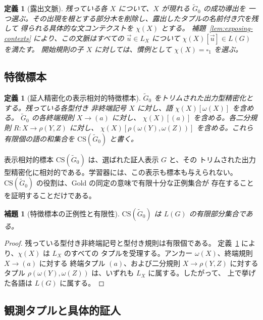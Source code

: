 \documentclass[11pt,a4paper]{ltjsarticle}
\newtheorem{lemma}[theorem]{補題}
\newtheorem{definition}[theorem]{定義}
\theoremstyle{remark}
\newcommand{\CS}{\mathrm{CS}}
\newcommand{\tuple}[1]{\vec{#1}}
\newcommand{\blank}{\square}
\begin{document}
\begin{definition}[露出文脈]
\label{def:exposing-context}
残っている各 \(X\) について、\(X\) が現れる \(\widetilde G_0\) の成功導出を
一つ選ぶ。その出現を根とする部分木を削除し、露出したタプルの名前付き穴を残して
得られる具体的な文コンテクストを \(\chi(X)\) とする。
補題~\ref{lem:exposing-contexts} により、この文脈はすべての
\(\tuple u\in L_X\) について \(\chi(X)[\tuple u]\in L(G)\) を満たす。
開始規則の子 \(X\) に対しては、慣例として \(\chi(X)=\blank_1\) を選ぶ。
\end{definition}

\subsection{特徴標本}
\label{subsec:learner-grammar}

\begin{definition}[証人精密化の表示相対的特徴標本]
\label{def:cs}
\(\widetilde G_0\) をトリムされた出力型精密化とする。残っている各型付き
非終端記号 \(X\) に対し、語 \(\chi(X)[\omega(X)]\) を含める。
\(\widetilde G_0\) の各終端規則 \(X\to(a)\) に対し、
\(\chi(X)[(a)]\) を含める。各二分規則
\(R\colon X\to\rho(Y,Z)\) に対し、
\(\chi(X)[\rho(\omega(Y),\omega(Z))]\) を含める。これら有限個の語の和集合を
\(\CS(\widetilde G_0)\) と書く。
\end{definition}

表示相対的標本 \(\CS(\widetilde G_0)\) は、選ばれた証人表示 \(G\) と、その
トリムされた出力型精密化に相対的である。学習器には、この表示も標本も与えられない。
\(\CS(\widetilde G_0)\) の役割は、Gold の同定の意味で有限十分な正例集合が
存在することを証明することだけである。

\begin{lemma}[特徴標本の正例性と有限性]
\label{lem:cs-positive}
\(\CS(\widetilde G_0)\) は \(L(G)\) の有限部分集合である。
\end{lemma}

\begin{proof}
残っている型付き非終端記号と型付き規則は有限個である。
定義~\ref{def:exposing-context} により、\(\chi(X)\) は \(L_X\) のすべての
タプルを受理する。アンカー \(\omega(X)\)、終端規則 \(X\to(a)\) に対する
終端タプル \((a)\)、および二分規則 \(X\to\rho(Y,Z)\) に対するタプル
\(\rho(\omega(Y),\omega(Z))\) は、いずれも \(L_X\) に属する。したがって、
上で挙げた各語は \(L(G)\) に属する。
\end{proof}




\subsection{観測タプルと具体的証人}
\end{document}

